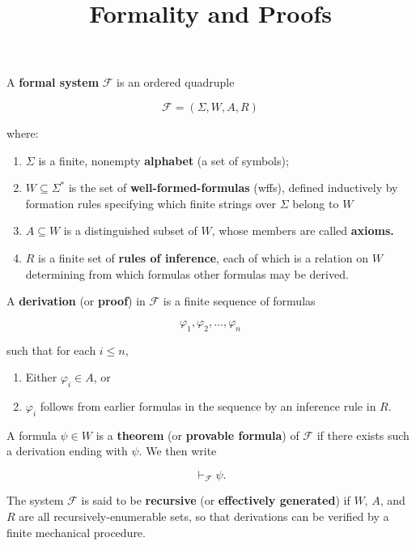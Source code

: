 \documentclass{article}
\title{Formality and Proofs}
\begin{document}
\begin{definition}
A  \textbf{formal system} $\mathcal{F}$ is an ordered quadruple

\[ \mathcal{F} = (\Sigma, W, A, R) \]

where:

\begin{enumerate}
\item $\Sigma$ is a finite, nonempty \textbf{alphabet} (a set of symbols);
\item $W \subseteq \Sigma^{*}$ is the set of \textbf{well-formed-formulas} (wffs), defined inductively by formation rules specifying which finite strings over $\Sigma$ belong to $W$
\item $A \subseteq W$ is a distinguished \@{subset} of $W$, whose \@{members} are called \textbf{axioms.}
\item $R$ is a finite set of \textbf{rules of inference}, each of which is a relation on $W$ determining from which formulas other formulas may be derived.
\end{enumerate}
\end{definition}

\begin{definition}[Derivation]
A \textbf{derivation} (or \textbf{proof}) in $\mathcal{F}$ is a \@{finite} \@{sequence} of formulas

\[ \varphi_1, \varphi_2, \dots, \varphi_n \]

such that for each $i \le n$,

\begin{enumerate}
\item Either $\varphi_i \in A$, or
\item $\varphi_i$ follows from earlier formulas in the sequence by an inference rule in $R$.
\end{enumerate}
\end{definition}

\begin{definition}[theorem]
A formula $\psi \in W$ is a \textbf{theorem} (or \textbf{provable formula}) of $\mathcal{F}$ if there exists such a \@{derivation} ending with $\psi$. We then write

\[ \vdash_{\mathcal{F}} \psi. \]
\end{definition}

\begin{definition}[recursive]
The system $\mathcal{F}$ is said to be \textbf{recursive} (or \textbf{effectively generated}) if $W$, $A$, and $R$ are all \@{recursively-enumerable} sets, so that \@{derivations} can be verified by a finite mechanical procedure.
\end{definition}
\end{document}
